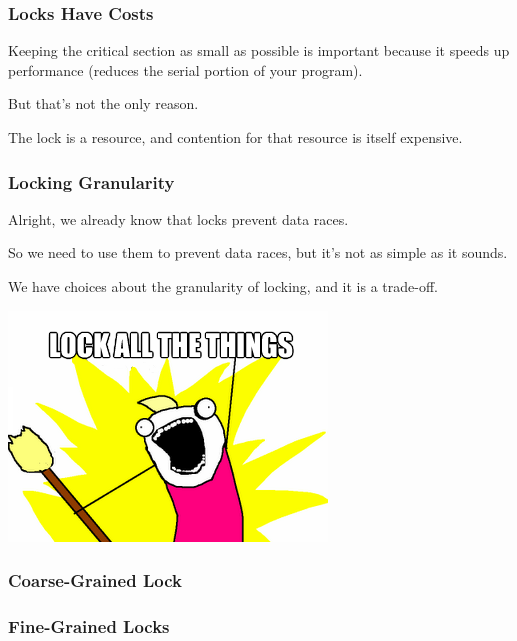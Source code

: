 \begin{frame}
\frametitle{Locks Have Costs}

Keeping the critical section as small as possible is important because it speeds up performance (reduces the serial portion of your program). 

But that's not the only reason. 

The lock is a resource, and contention for that resource is itself expensive.


\end{frame}


\begin{frame}
\frametitle{Locking Granularity}
Alright, we already know that locks prevent data races.

So we need to use them to prevent data races, but it's not as simple as it sounds. 

We have choices about the granularity of locking, and it is a trade-off.


  \begin{center}
    \includegraphics[scale=0.5]{images/lock-all-the-things}
  \end{center}
\end{frame}

\begin{frame}
\frametitle{Coarse-Grained Lock}

  \begin{center}
    
  \end{center}

\end{frame}

\begin{frame}
\frametitle{Fine-Grained Locks}

  \begin{center}
    
  \end{center}

\end{frame}

